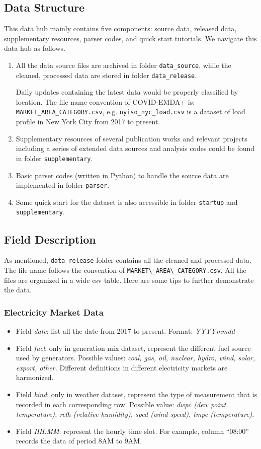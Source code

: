 \documentclass[10pt]{article}
\numberwithin{equation}{section}
\numberwithin{table}{section}
\numberwithin{figure}{section}
\begin{document}
\subsection{Data Structure}
This data hub mainly contains five components: source data, released data, supplementary resources, parser codes, and quick start tutorials. We navigate this data hub as follows.

\begin{enumerate}
    \item All the data source files are archived in folder \verb!data_source!, while the cleaned, processed data are stored in folder \verb!data_release!.
    
    Daily updates containing the latest data would be properly classified by location. The file name convention of COVID-EMDA+ is: \verb!MARKET_AREA_CATEGORY.csv!, e.g. \verb!nyiso_nyc_load.csv! is a dataset of load profile in New York City from 2017 to present.
    \item Supplementary resources of several publication works and relevant projects including a series of extended data sources and analysis codes could be found in folder \verb!supplementary!.
    \item Basic parser codes (written in Python) to handle the source data are implemented in folder \verb!parser!.
    \item Some quick start for the dataset is also accessible in folder \verb!startup! and \verb!supplementary!.
\end{enumerate}




\subsection{Field Description}
As mentioned, \verb!data_release! folder contains all the cleaned and processed data. The file name follows the convention of \verb!MARKET\_AREA\_CATEGORY.csv!. 
All the files are organized in a wide csv table. Here are some tips to further demonstrate the data.
\subsubsection{Electricity Market Data}
\begin{itemize}
	\item Field \textit{date}: list all the date from 2017 to present. Format: \textit{YYYYmmdd}
	\item Field \textit{fuel}: only in generation mix dataset, represent the different fuel source used by generators. Possible values: \textit{coal, gas, oil, nuclear, hydro, wind, solar, export, other.} Different definitions in different electricity markets are harmonized.
	\item Field \textit{kind}: only in weather dataset, represent the type of measurement that is recorded in each corresponding row. Possible value: \textit{dwpc (dew point temperature), relh (relative humidity), sped (wind speed), tmpc (temperature)}.
	\item Field \textit{HH:MM}: represent the hourly time slot. For example, column ``08:00'' records the data of period 8AM to 9AM.
\end{itemize}
\end{document}
